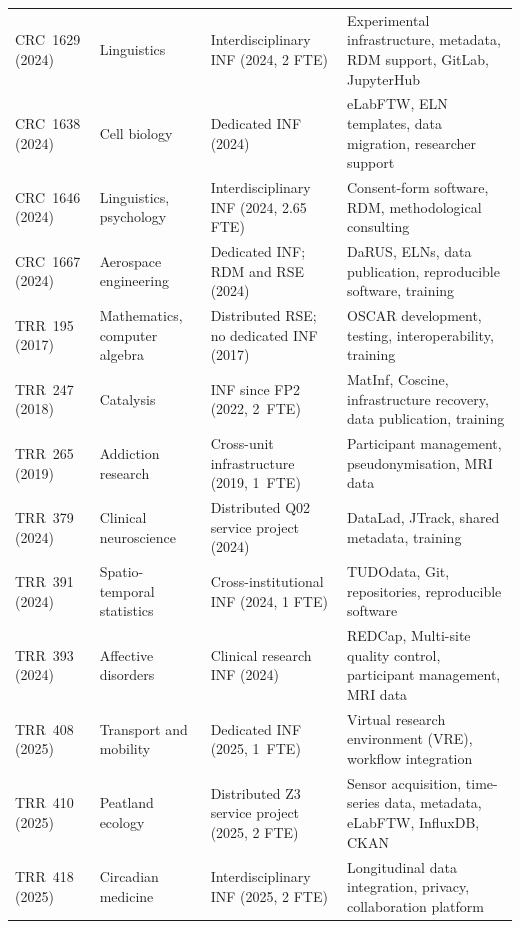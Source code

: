 \documentclass{eceasst}
\begin{document}
\begin{longtable}{@{}
  P{.12\linewidth}
  P{.19\linewidth}
  P{.24\linewidth}
  P{.40\linewidth}
  @{}}
CRC~1629 (2024) &
Linguistics &
Interdisciplinary INF (2024, 2 FTE) &
Experimental infrastructure, metadata,
RDM support, GitLab, JupyterHub
\\

CRC~1638 (2024)&
Cell biology &
Dedicated INF (2024) &
eLabFTW, ELN templates, data migration,
researcher support
\\

CRC~1646 (2024)&
Linguistics, psychology &
Interdisciplinary INF (2024, 2.65 FTE) &
Consent-form software, RDM,
methodological consulting
\\

CRC~1667 (2024) &
Aerospace engineering &
Dedicated INF; RDM and RSE (2024) &
DaRUS, ELNs, data publication, reproducible software, training
\\

TRR~195 (2017) &
Mathematics, computer algebra &
Distributed RSE; no dedicated INF (2017) &
OSCAR development, testing, interoperability,
training
\\

TRR~247 (2018) &
Catalysis &
INF since FP2 (2022, 2~FTE) &
MatInf, Coscine, infrastructure recovery,
data publication, training
\\

TRR~265 (2019) &
Addiction research &
Cross-unit infrastructure (2019, 1~FTE) &
Participant management, pseudonymisation,
MRI data
\\

TRR~379 (2024) &
Clinical neuroscience &
Distributed Q02 service project (2024)&
DataLad, JTrack, shared metadata,
training
\\

TRR~391 (2024)&
Spatio-temporal statistics &
Cross-institutional INF (2024, 1 FTE) &
TUDOdata, Git, repositories,
reproducible software
\\

TRR~393 (2024) &
Affective disorders &
Clinical research INF (2024)&
REDCap, Multi-site quality control, participant management, MRI data
\\

TRR~408 (2025) &
Transport and mobility &
Dedicated INF (2025, 1~FTE) &
Virtual research environment (VRE),
workflow integration
\\

TRR~410 (2025)&
Peatland ecology &
Distributed Z3 service project (2025, 2 FTE)&
Sensor acquisition, time-series data,
metadata, eLabFTW, InfluxDB, CKAN
\\

TRR~418 (2025)&
Circadian medicine &
Interdisciplinary INF (2025, 2 FTE)&
Longitudinal data integration,
privacy, collaboration platform
\\

\end{longtable}
\endgroup
\end{document}
